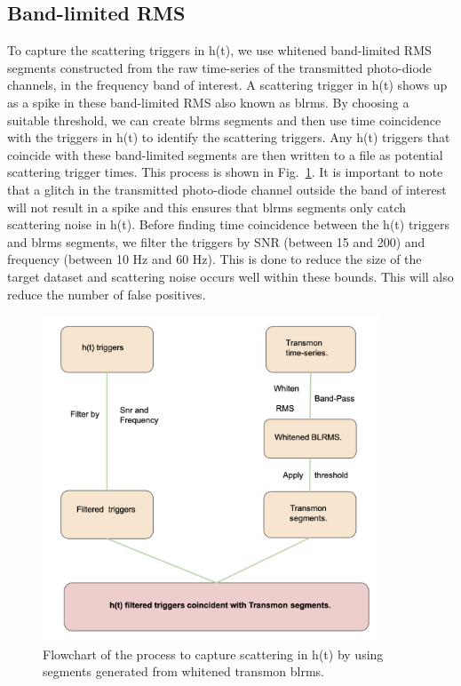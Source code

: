 \documentclass[12pt]{iopart}
\begin{document}
\subsection{Band-limited RMS}
To capture the scattering triggers in h(t), we use whitened band-limited RMS segments constructed from the raw time-series of the transmitted photo-diode channels, in the frequency band of interest. A scattering trigger in h(t) shows up as a spike in these band-limited RMS also known as blrms. By choosing a suitable threshold, we can create blrms segments and then use time coincidence with the triggers in h(t) to identify the scattering triggers. Any h(t) triggers that coincide with these band-limited segments are then written to a file as potential scattering trigger times.  This process is shown in Fig.~\ref{fig:flow}. It is important to note that a glitch in the transmitted photo-diode channel outside the band of interest will not result in a spike and this ensures that blrms segments only catch scattering noise in h(t). Before finding time coincidence between the h(t) triggers and blrms segments, we filter the triggers by SNR (between 15 and 200) and frequency (between 10 Hz and 60 Hz). This is done to reduce the size of the target dataset and scattering noise occurs well within these bounds. This will also reduce the number of false positives. 


\quad
\begin{figure}[h]
    \centering
    \includegraphics[width=10cm]{flow.png}
    \caption{Flowchart of the process to capture scattering in h(t) by using segments generated from whitened transmon blrms.}
    \label{fig:flow}
\end{figure}
\end{document}
